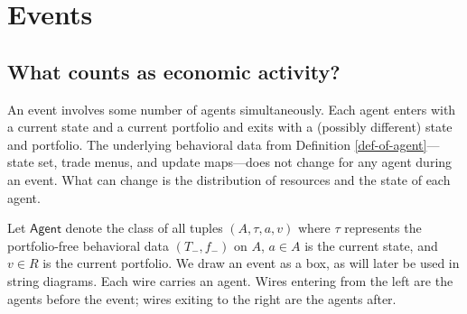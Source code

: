 \documentclass[11pt, one side, article]{memoir}
\theoremstyle{definition}
\theoremstyle{plain}
\newcommand{\Set}[1]{\mathsf{#1}}%
\newcommand{\0}{\textsf{0}}
\newcommand{\1}{\tn{\textsf{1}}}
\begin{document}
\section*{Events}

\subsection*{What counts as economic activity?}
An event involves some number of agents simultaneously.  Each agent enters with a current state and a current portfolio and exits with a (possibly different) state and portfolio.  The underlying behavioral data from Definition \ref{def-of-agent}---state set, trade menus, and update maps---does not change for any agent during an event.  What can change is the distribution of resources and the state of each agent.

Let $\Set{Agent}$ denote the class of all tuples $(A, \tau, a, v)$ where $\tau$ represents the portfolio-free behavioral data $(T_-,f_-)$ on $A$, $a\in A$ is the current state, and $v \in R$ is the current portfolio.  We draw an event as a box, as will later be used in string diagrams.  Each wire carries an agent.  Wires entering from the left are the agents before the event; wires exiting to the right are the agents after.
\end{document}
